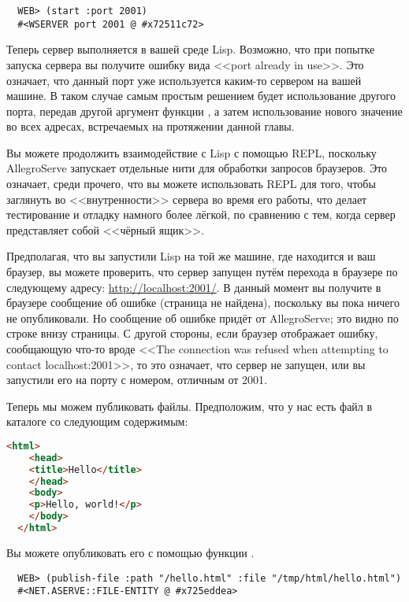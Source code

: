 \begin{lstlisting}
  WEB> (start :port 2001)
  #<WSERVER port 2001 @ #x72511c72>
\end{lstlisting}

Теперь сервер выполняется в вашей среде Lisp. Возможно, что при попытке запуска сервера вы
получите ошибку вида <<port already in use>>. Это означает, что данный порт уже
используется каким-то сервером на вашей машине. В таком случае самым простым решением
будет использование другого порта, передав другой аргумент функции , а затем
использование нового значение во всех адресах, встречаемых на протяжении данной главы.

Вы можете продолжить взаимодействие с Lisp с помощью REPL, поскольку AllegroServe
запускает отдельные нити для обработки запросов браузеров. Это означает, среди прочего,
что вы можете использовать REPL для того, чтобы заглянуть во <<внутренности>> сервера во
время его работы, что делает тестирование и отладку намного более лёгкой, по сравнению с
тем, когда сервер представляет собой <<чёрный ящик>>.

Предполагая, что вы запустили Lisp на той же машине, где находится и ваш браузер, вы
можете проверить, что сервер запущен путём перехода в браузере по следующему адресу:
\url{http://localhost:2001/}. В данный момент вы получите в браузере сообщение об ошибке
 (страница не найдена), поскольку вы пока ничего не опубликовали. Но
сообщение об ошибке придёт от AllegroServe; это видно по строке внизу страницы. С другой
стороны, если браузер отображает ошибку, сообщающую что-то вроде <<The connection was
refused when attempting to contact localhost:2001>>, то это означает, что сервер не
запущен, или вы запустили его на порту с номером, отличным от 2001.

Теперь мы можем публиковать файлы. Предположим, что у нас есть файл  в
каталоге  со следующим содержимым:

\begin{lstlisting}[language=HTML]
  <html>
    <head>
    <title>Hello</title>
    </head>
    <body>
    <p>Hello, world!</p>
    </body>
  </html>
\end{lstlisting}

Вы можете опубликовать его с помощью функции .

\begin{lstlisting}
  WEB> (publish-file :path "/hello.html" :file "/tmp/html/hello.html")
  #<NET.ASERVE::FILE-ENTITY @ #x725eddea>
\end{lstlisting}

